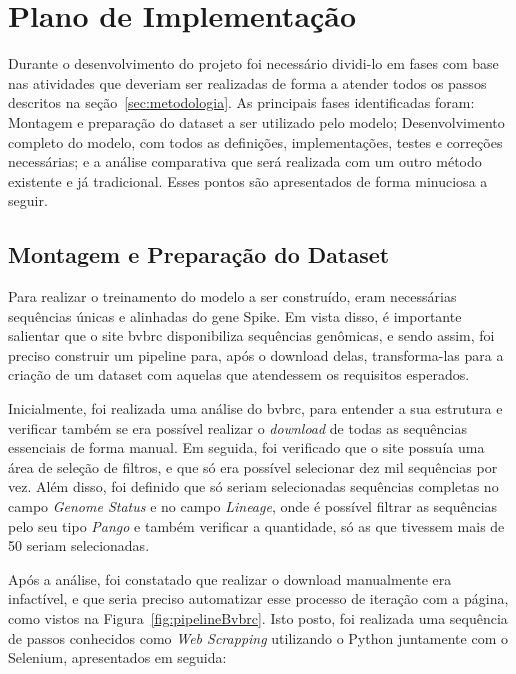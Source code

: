 
\section{Plano de Implementação}
Durante o desenvolvimento do projeto foi necessário dividi-lo em fases com base nas atividades que deveriam ser realizadas de forma a atender todos os passos descritos na seção~\ref{sec:metodologia}. As principais fases identificadas foram: Montagem e preparação do dataset a ser utilizado pelo modelo; Desenvolvimento completo do modelo, com todos as definições, implementações, testes e correções necessárias; e a análise comparativa que será realizada com um outro método existente e já tradicional. Esses pontos são apresentados de forma minuciosa a seguir.

\subsection{Montagem e Preparação do Dataset}
Para realizar o treinamento do modelo a ser construído, eram necessárias sequências únicas e alinhadas do gene Spike. Em vista disso, é importante salientar que o site \gls{bvbrc} disponibiliza sequências genômicas, e sendo assim, foi preciso construir um pipeline para, após o download delas, transforma-las para a criação de um dataset com aquelas que atendessem os requisitos esperados.

Inicialmente, foi realizada uma análise do \gls{bvbrc}, para entender a sua estrutura e verificar também se era possível realizar o \textit{download} de todas as sequências essenciais de forma manual. Em seguida, foi verificado que o site possuía uma área de seleção de filtros, e que só era possível selecionar dez mil sequências por vez. Além disso, foi definido que só seriam selecionadas sequências completas no campo \textit{Genome Status} e no campo \textit{Lineage}, onde é possível filtrar as sequências pelo seu tipo \textit{Pango} e também verificar a quantidade, só as que tivessem mais de 50 seriam selecionadas.

Após a análise, foi constatado que realizar o download manualmente era infactível, e que seria preciso automatizar esse processo de iteração com a página, como vistos na Figura~\ref{fig:pipelineBvbrc}. Isto posto, foi realizada uma sequência de passos conhecidos como \textit{Web Scrapping} utilizando o Python juntamente com o Selenium, apresentados em seguida:

